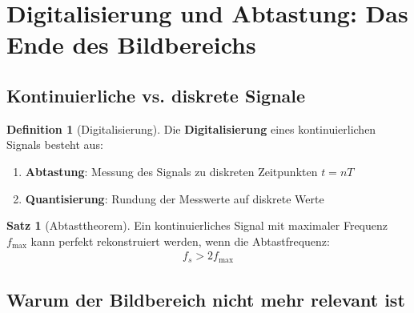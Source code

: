 ﻿\documentclass[a4paper,12pt]{report}
\theoremstyle{definition}
\newtheorem{definition}{Definition}
\newtheorem{satz}{Satz}
\begin{document}
	\section{Digitalisierung und Abtastung: Das Ende des Bildbereichs}
	
	\subsection{Kontinuierliche vs. diskrete Signale}
	
	\begin{definition}[Digitalisierung]
		Die \textbf{Digitalisierung} eines kontinuierlichen Signals besteht aus:
		\begin{enumerate}
			\item[-] \textbf{Abtastung}: Messung des Signals zu diskreten Zeitpunkten $t = nT$
			\item[-] \textbf{Quantisierung}: Rundung der Messwerte auf diskrete Werte
		\end{enumerate}
	\end{definition}
	
	\begin{satz}[Abtasttheorem]
		Ein kontinuierliches Signal mit maximaler Frequenz $f_{\max}$ kann perfekt rekonstruiert werden, wenn die Abtastfrequenz:
		\begin{align}
			f_s > 2 f_{\max}
		\end{align}
	\end{satz}
	
	\subsection{Warum der Bildbereich nicht mehr relevant ist}
	
\end{document}

